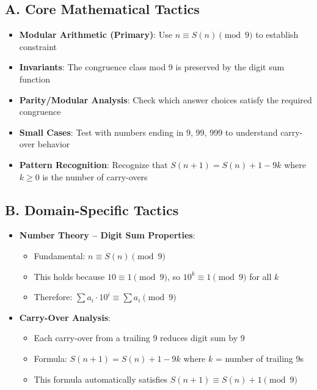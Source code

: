 \documentclass[]{article}
\begin{document}
\begin{tacticalbox}
\subsection*{A. Core Mathematical Tactics}
\begin{itemize}[leftmargin=*]
    \item \textbf{Modular Arithmetic (Primary)}: Use $n \equiv S(n) \pmod{9}$ to establish constraint
    \item \textbf{Invariants}: The congruence class mod 9 is preserved by the digit sum function
    \item \textbf{Parity/Modular Analysis}: Check which answer choices satisfy the required congruence
    \item \textbf{Small Cases}: Test with numbers ending in 9, 99, 999 to understand carry-over behavior
    \item \textbf{Pattern Recognition}: Recognize that $S(n+1) = S(n) + 1 - 9k$ where $k \geq 0$ is the number of carry-overs
\end{itemize}

\subsection*{B. Domain-Specific Tactics}
\begin{itemize}[leftmargin=*]
    \item \textbf{Number Theory -- Digit Sum Properties}:
    \begin{itemize}
        \item Fundamental: $n \equiv S(n) \pmod{9}$
        \item This holds because $10 \equiv 1 \pmod{9}$, so $10^k \equiv 1 \pmod{9}$ for all $k$
        \item Therefore: $\sum a_i \cdot 10^i \equiv \sum a_i \pmod{9}$
    \end{itemize}
    \item \textbf{Carry-Over Analysis}:
    \begin{itemize}
        \item Each carry-over from a trailing 9 reduces digit sum by 9
        \item Formula: $S(n+1) = S(n) + 1 - 9k$ where $k$ = number of trailing 9s
        \item This formula automatically satisfies $S(n+1) \equiv S(n) + 1 \pmod{9}$
    \end{itemize}
\end{itemize}


\end{tacticalbox}
\end{document}
